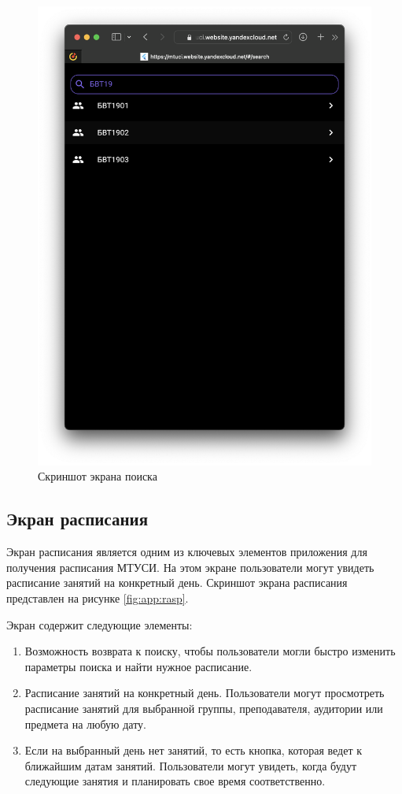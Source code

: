 \begin{figure}
\centering
\includegraphics[width=0.7\linewidth]{images/app/search.png}
\caption{Скриншот экрана поиска}
\label{fig:app:search}
\end{figure}

\break
\subsection{Экран расписания}
Экран расписания является одним из ключевых элементов приложения для получения расписания МТУСИ.
На этом экране пользователи могут увидеть расписание занятий на конкретный день. 
Скриншот экрана расписания представлен на рисунке \ref{fig:app:rasp}.

Экран содержит следующие элементы:
\begin{enumerate}
    \item Возможность возврата к поиску, 
    чтобы пользователи могли быстро изменить параметры поиска и найти нужное расписание.
    \item Расписание занятий на конкретный день.
    Пользователи могут просмотреть расписание занятий для выбранной группы,
    преподавателя, аудитории или предмета на любую дату.
    \item Если на выбранный день нет занятий,
    то есть кнопка, которая ведет к ближайшим датам занятий.
    Пользователи могут увидеть, когда будут следующие занятия и планировать свое время соответственно.
\end{enumerate}


